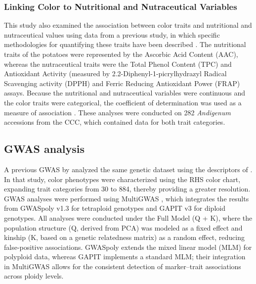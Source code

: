 \documentclass[pdflatex,sn-mathphys-ay]{sn-jnl}%
\begin{document}
\subsubsection{Linking Color to Nutritional and Nutraceutical Variables}

This study also examined the association between color traits and nutritional and nutraceutical values using data from a previous study, in which specific methodologies for quantifying these traits have been described \citep{berdugo2023phenotypic}. The nutritional traits of the potatoes were represented by the Ascorbic Acid Content (AAC), whereas the nutraceutical traits were the Total Phenol Content (TPC) and Antioxidant Activity (measured by 2.2-Diphenyl-1-picrylhydrazyl Radical Scavenging activity (DPPH) and Ferric Reducing Antioxidant Power (FRAP) assays.
Because the nutritional and nutraceutical variables were continuous and the color traits were categorical, the coefficient of determination was used as a measure of association \citep{nagelkerke1991note}. These analyses were conducted on 282 \textit{Andigenum} accessions from the CCC, which contained data for both trait categories.


\subsection{GWAS analysis \label{subsec:GWAS-process} }





A previous GWAS by \cite{Berdugo2017} analyzed the same genetic dataset using the descriptors of \cite{gomez2000guia}. In that study, color phenotypes were characterized using the RHS color chart, expanding trait categories from 30 to 884, thereby providing a greater resolution. GWAS analyses were performed using MultiGWAS \citep{Garreta2021}, which integrates the results from GWASpoly v1.3 \citep{Rosyara2016} for tetraploid genotypes and GAPIT v3 \citep{Tan2016} for diploid genotypes. All analyses were conducted under the Full Model (Q + K), where the population structure (Q, derived from PCA) was modeled as a fixed effect and kinship (K, based on a genetic relatedness matrix) as a random effect, reducing false-positive associations. GWASpoly extends the mixed linear model (MLM) for polyploid data, whereas GAPIT implements a standard MLM; their integration in MultiGWAS allows for the consistent detection of marker–trait associations across ploidy levels.
\end{document}
